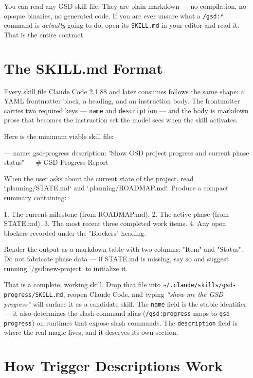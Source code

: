 \documentclass[11pt,letterpaper,openany]{book}
\begin{document}
\begin{gsdtip}
You can read any GSD skill file. They are plain markdown --- no compilation,
no opaque binaries, no generated code. If you are ever unsure what a
\texttt{/gsd:*} command is \emph{actually} going to do, open its
\texttt{SKILL.md} in your editor and read it. That is the entire contract.
\end{gsdtip}

\section{The SKILL.md Format}

Every skill file Claude Code 2.1.88 and later consumes follows the same
shape: a YAML frontmatter block, a heading, and an instruction body. The
frontmatter carries two required keys --- \texttt{name} and
\texttt{description} --- and the body is markdown prose that becomes the
instruction set the model sees when the skill activates.

Here is the minimum viable skill file:

\begin{gsdplain}
---
name: gsd-progress
description: "Show GSD project progress and current phase status"
---
# GSD Progress Report

When the user asks about the current state of the project, read
`.planning/STATE.md` and `.planning/ROADMAP.md`. Produce a compact
summary containing:

1. The current milestone (from ROADMAP.md).
2. The active phase (from STATE.md).
3. The most recent three completed work items.
4. Any open blockers recorded under the "Blockers" heading.

Render the output as a markdown table with two columns: "Item" and
"Status". Do not fabricate phase data --- if STATE.md is missing, say
so and suggest running `/gsd:new-project` to initialize it.
\end{gsdplain}

That is a complete, working skill. Drop that file into
\texttt{\~{}/.claude/skills/gsd-progress/SKILL.md}, reopen Claude Code, and
typing \textit{``show me the GSD progress''} will surface it as a candidate
skill. The \texttt{name} field is the stable identifier --- it also
determines the slash-command alias (\texttt{/gsd:progress} maps to
\texttt{gsd-progress}) on runtimes that expose slash commands. The
\texttt{description} field is where the real magic lives, and it deserves
its own section.

\section{How Trigger Descriptions Work}
\end{document}
